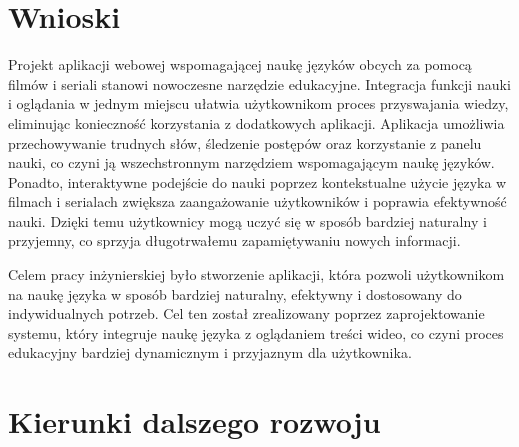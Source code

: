 
\section{Wnioski}

Projekt aplikacji webowej wspomagającej naukę języków obcych za pomocą filmów i seriali stanowi nowoczesne narzędzie edukacyjne. Integracja funkcji nauki i oglądania w jednym miejscu ułatwia użytkownikom proces przyswajania wiedzy, eliminując konieczność korzystania z dodatkowych aplikacji. Aplikacja umożliwia przechowywanie trudnych słów, śledzenie postępów oraz korzystanie z panelu nauki, co czyni ją wszechstronnym narzędziem wspomagającym naukę języków. Ponadto, interaktywne podejście do nauki poprzez kontekstualne użycie języka w filmach i serialach zwiększa zaangażowanie użytkowników i poprawia efektywność nauki. Dzięki temu użytkownicy mogą uczyć się w sposób bardziej naturalny i przyjemny, co sprzyja długotrwałemu zapamiętywaniu nowych informacji.

Celem pracy inżynierskiej było stworzenie aplikacji, która pozwoli użytkownikom na naukę języka w sposób bardziej naturalny, efektywny i dostosowany do indywidualnych potrzeb. Cel ten został zrealizowany poprzez zaprojektowanie systemu, który integruje naukę języka z oglądaniem treści wideo, co czyni proces edukacyjny bardziej dynamicznym i przyjaznym dla użytkownika.



\section{Kierunki dalszego rozwoju}

